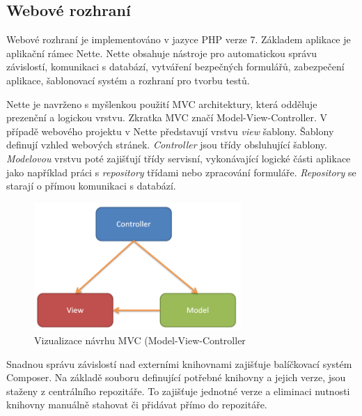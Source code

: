 \documentclass[thesis=B,czech]{FITthesis}[2012/06/26]
\begin{document}
\subsection{Webové rozhraní}
Webové rozhraní je implementováno v jazyce PHP verze 7. Základem aplikace je aplikační rámec Nette\cite{nette}. Nette
obsahuje nástroje pro automatickou správu závislostí, komunikaci s databází, vytváření bezpečných formulářů, zabezpečení
aplikace, šablonovací systém a rozhraní pro tvorbu testů. 
\par
Nette je navrženo s myšlenkou použití MVC architektury, která odděluje
prezenční a logickou vrstvu. Zkratka MVC značí Model-View-Controller. V případě webového projektu v Nette představují vrstvu \textit{view} šablony.
Šablony definují vzhled webových stránek. \textit{Controller} jsou třídy obsluhující šablony. \textit{Modelovou} vrstvu poté zajišťují třídy servisní, vykonávající logické části aplikace jako 
například práci s \textit{repository} třídami nebo zpracování formuláře. \textit{Repository} se starají o přímou komunikaci s databází.

\begin{figure}[h]\centering
 	\includegraphics[width=0.7\textwidth]{resources/mvc}
	\caption[MVC]{Vizualizace návrhu MVC (Model-View-Controller}\label{fig:mvc}
\end{figure}
\par
Snadnou správu závislostí nad externími knihovnami zajišťuje balíčkovací systém Composer\cite{composer}. 
Na základě souboru definující potřebné knihovny a jejich verze, jsou staženy z centrálního repozitáře. To zajišťuje jednotné verze
a eliminaci nutnosti knihovny manuálně stahovat či přidávat přímo do repozitáře.
\end{document}
